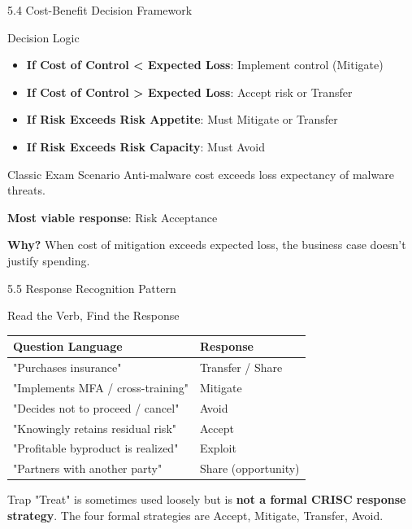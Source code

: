 \documentclass{beamer}
\begin{document}
	\begin{frame}{5.4 Cost-Benefit Decision Framework}
		\begin{block}{Decision Logic}
			\begin{itemize}
				\item \textbf{If Cost of Control < Expected Loss}: Implement control (Mitigate)
				\item \textbf{If Cost of Control > Expected Loss}: Accept risk or Transfer
				\item \textbf{If Risk Exceeds Risk Appetite}: Must Mitigate or Transfer
				\item \textbf{If Risk Exceeds Risk Capacity}: Must Avoid
			\end{itemize}
		\end{block}
		
		\begin{exampleblock}{Classic Exam Scenario}
			Anti-malware cost exceeds loss expectancy of malware threats.
			
			\textbf{Most viable response}: Risk Acceptance
			
			\textbf{Why?} When cost of mitigation exceeds expected loss, the business case doesn't justify spending.
		\end{exampleblock}
	\end{frame}
	
	\begin{frame}{5.5 Response Recognition Pattern}
		\begin{block}{Read the Verb, Find the Response}
			\begin{tabular}{|p{4.5cm}|p{4cm}|}
				\hline
				\textbf{Question Language} & \textbf{Response} \\
				\hline
				"Purchases insurance" & Transfer / Share \\
				\hline
				"Implements MFA / cross-training" & Mitigate \\
				\hline
				"Decides not to proceed / cancel" & Avoid \\
				\hline
				"Knowingly retains residual risk" & Accept \\
				\hline
				"Profitable byproduct is realized" & Exploit \\
				\hline
				"Partners with another party" & Share (opportunity) \\
				\hline
			\end{tabular}
		\end{block}
		
		\begin{alertblock}{Trap}
			"Treat" is sometimes used loosely but is \textbf{not a formal CRISC response strategy}. The four formal strategies are Accept, Mitigate, Transfer, Avoid.
		\end{alertblock}
	\end{frame}
	
\end{document}
